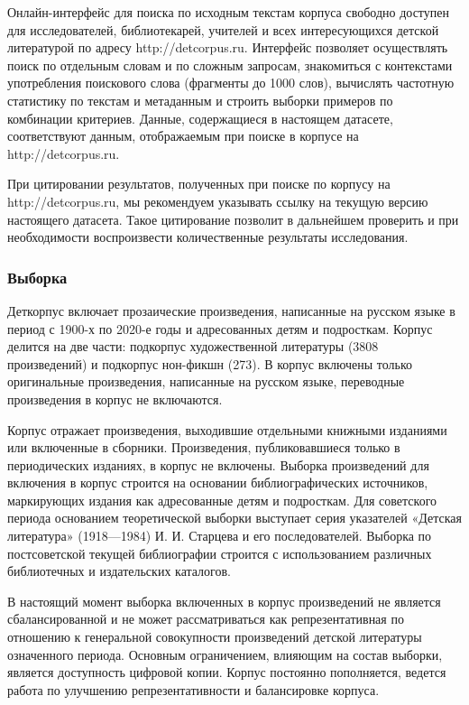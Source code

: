 \documentclass[
]{article}
\begin{document}
Онлайн-интерфейс для поиска по исходным текстам корпуса свободно
доступен для исследователей, библиотекарей, учителей и всех
интересующихся детской литературой по адресу http://detcorpus.ru.
Интерфейс позволяет осуществлять поиск по отдельным словам и по сложным
запросам, знакомиться с контекстами употребления поискового слова
(фрагменты до 1000 слов), вычислять частотную статистику по текстам и
метаданным и строить выборки примеров по комбинации критериев. Данные,
содержащиеся в настоящем датасете, соответствуют данным, отображаемым
при поиске в корпусе на http://detcorpus.ru.

При цитировании результатов, полученных при поиске по корпусу на
http://detcorpus.ru, мы рекомендуем указывать ссылку на текущую версию
настоящего датасета. Такое цитирование позволит в дальнейшем проверить и
при необходимости воспроизвести количественные результаты исследования.

\hypertarget{ux432ux44bux431ux43eux440ux43aux430}{%
\subsubsection{Выборка}\label{ux432ux44bux431ux43eux440ux43aux430}}

Деткорпус включает прозаические произведения, написанные на русском
языке в период с 1900-х по 2020-е годы и адресованных детям и
подросткам. Корпус делится на две части: подкорпус художественной
литературы (3808 произведений) и подкорпус нон-фикшн (273). В корпус
включены только оригинальные произведения, написанные на русском языке,
переводные произведения в корпус не включаются.

Корпус отражает произведения, выходившие отдельными книжными изданиями
или включенные в сборники. Произведения, публиковавшиеся только в
периодических изданиях, в корпус не включены. Выборка произведений для
включения в корпус строится на основании библиографических источников,
маркирующих издания как адресованные детям и подросткам. Для советского
периода основанием теоретической выборки выступает серия указателей
«Детская литература» (1918---1984) И. И. Старцева и его последователей.
Выборка по постсоветской текущей библиографии строится с использованием
различных библиотечных и издательских каталогов.

В настоящий момент выборка включенных в корпус произведений не является
сбалансированной и не может рассматриваться как репрезентативная по
отношению к генеральной совокупности произведений детской литературы
означенного периода. Основным ограничением, влияющим на состав выборки,
является доступность цифровой копии. Корпус постоянно пополняется,
ведется работа по улучшению репрезентативности и балансировке корпуса.
\end{document}
